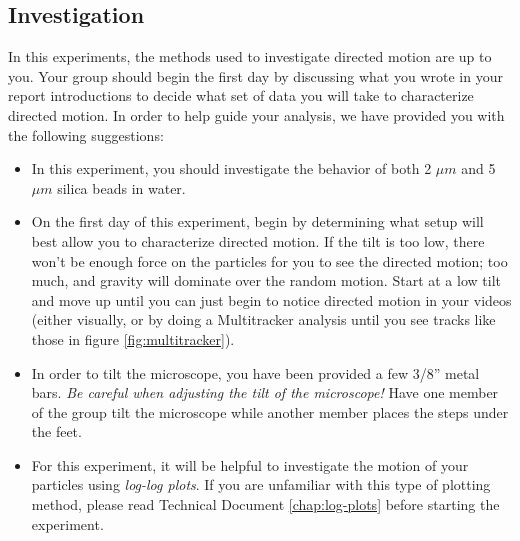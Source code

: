\subsection*{Investigation}
In this experiments, the methods used to investigate directed motion are up to you.
Your group should begin the first day by discussing what you wrote in your report introductions to decide what set of data you will take to characterize directed motion.
In order to help guide your analysis, we have provided you with the following suggestions:
\begin{itemize}
\item In this experiment, you should investigate the behavior of both 2 $\mu m$ and 5 $\mu m$ silica beads in water.
\item On the first day of this experiment, begin by determining what setup will best allow you to characterize directed motion. If the tilt is too low, there won't be enough force on the particles for you to see the directed motion; too much, and gravity will dominate over the random motion. Start at a low tilt and move up until you can just begin to notice directed motion in your videos (either visually, or by doing a Multitracker analysis until you see tracks like those in figure \ref{fig:multitracker}).
\item In order to tilt the microscope, you have been provided a few 3/8'' metal bars. \emph{Be careful when adjusting the tilt of the microscope!} Have one member of the group tilt the microscope while another member places the steps under the feet.
\item For this experiment, it will be helpful to investigate the motion of your particles using \emph{log-log plots}. If you are unfamiliar with this type of plotting method, please read Technical Document \ref{chap:log-plots} before starting the experiment.
\end{itemize}
%
